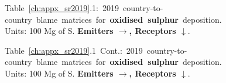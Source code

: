 

\cleartoleftpage

\newlength{\previousparindent}
\setlength{\previousparindent}{\parindent}
\setlength{\parindent}{0pt}
\newlength{\previousheadsep}
\setlength{\previousheadsep}{\headsep}

\newlength{\myheadsep}
\setlength{\myheadsep}{0.5\headsep}
\setlength{\headsep}{\myheadsep}

\newlength{\mywidth}
\newlength{\myheight}
\newlength{\myenlarge}

\setlength{\mywidth}{1.1\textwidth}
\setlength{\myheight}{1.00\textheight}
\setlength{\myenlarge}{8\baselineskip}



\footnotesize{\mbox{Table \ref{ch:appx_sr2019}.1: 2019
    country-to-country blame matrices for \textbf{oxidised sulphur}
    deposition.}\\ Units: 100 Mg of S. \textbf{Emitters
      $\rightarrow$, Receptors $\downarrow$}. }\\[\baselineskip]\enlargethispage{\myenlarge} \hspace{-0.5cm} 
\centerline{}\clearpage
\footnotesize{\mbox{Table \ref{ch:appx_sr2019}.1 Cont.: 2019
    country-to-country blame matrices for \textbf{oxidised sulphur}
    deposition.}\\ Units: 100 Mg of S. \textbf{Emitters
      $\rightarrow$, Receptors $\downarrow$}. }\\[\baselineskip]\enlargethispage{\myenlarge} \hspace{-0.5cm} 
\centerline{}\clearpage

